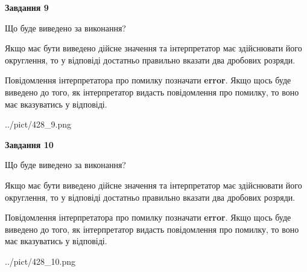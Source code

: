 \documentclass[12pt, ukrainian]{article}
\begin{document}
{\begin {Large}
{\begin {center}\textbf{Завдання 9}\end {center}}\par
Що буде виведено за виконання? \par

Якщо має бути виведено дійсне значення та інтерпретатор має здійснювати його округлення, 
то у відповіді достатньо правильно вказати два дробових розряди.

Повідомлення інтерпретатора про помилку позначати \textbf{error}.
Якщо щось буде виведено до того, як інтерпретатор видасть повідомлення про помилку, 
то воно має вказуватись у відповіді. \par

\begin{center}
	{../pict/428_9.png}
\end{center}
\newpage

{\begin {center}\textbf{Завдання 10}\end {center}}\par
Що буде виведено за виконання? \par

Якщо має бути виведено дійсне значення та інтерпретатор має здійснювати його округлення, 
то у відповіді достатньо правильно вказати два дробових розряди.

Повідомлення інтерпретатора про помилку позначати \textbf{error}.
Якщо щось буде виведено до того, як інтерпретатор видасть повідомлення про помилку, 
то воно має вказуватись у відповіді. \par

\begin{center}
	{../pict/428_10.png}
\end{center}
\newpage

\end {Large}}
\end{document}

